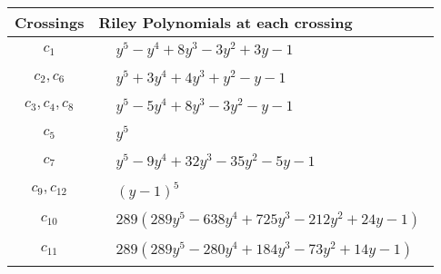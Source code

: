 \documentclass[1p]{elsarticle_modified}
\theoremstyle{definition}
\begin{document}
\begin{tabular}{m{50pt}|m{274pt}}
Crossings & \hspace{64pt}Riley Polynomials at each crossing \\
\hline $$\begin{aligned}c_{1}\end{aligned}$$&$\begin{aligned}
&y^5- y^4+8 y^3-3 y^2+3 y-1
\end{aligned}$\\
\hline $$\begin{aligned}c_{2},c_{6}\end{aligned}$$&$\begin{aligned}
&y^5+3 y^4+4 y^3+y^2- y-1
\end{aligned}$\\
\hline $$\begin{aligned}c_{3},c_{4},c_{8}\end{aligned}$$&$\begin{aligned}
&y^5-5 y^4+8 y^3-3 y^2- y-1
\end{aligned}$\\
\hline $$\begin{aligned}c_{5}\end{aligned}$$&$\begin{aligned}
&y^5
\end{aligned}$\\
\hline $$\begin{aligned}c_{7}\end{aligned}$$&$\begin{aligned}
&y^5-9 y^4+32 y^3-35 y^2-5 y-1
\end{aligned}$\\
\hline $$\begin{aligned}c_{9},c_{12}\end{aligned}$$&$\begin{aligned}
&(y-1)^5
\end{aligned}$\\
\hline $$\begin{aligned}c_{10}\end{aligned}$$&$\begin{aligned}
&289(289 y^5-638 y^4+725 y^3-212 y^2+24 y-1)
\end{aligned}$\\
\hline $$\begin{aligned}c_{11}\end{aligned}$$&$\begin{aligned}
&289(289 y^5-280 y^4+184 y^3-73 y^2+14 y-1)
\end{aligned}$\\
\hline
\end{tabular}\\~\\
\end{document}
